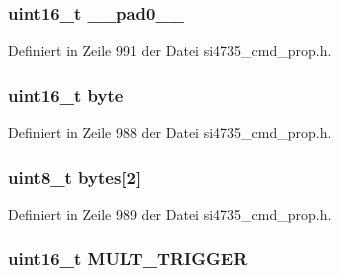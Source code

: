 \subsubsection[{\+\_\+\+\_\+pad0\+\_\+\+\_\+}]{\setlength{\rightskip}{0pt plus 5cm}uint16\+\_\+t \+\_\+\+\_\+pad0\+\_\+\+\_\+}\label{unionfm__hicut__multi__trigger__thres_a77132c2c26a75f5b8751b235cda23828}


Definiert in Zeile 991 der Datei si4735\+\_\+cmd\+\_\+prop.\+h.

\hypertarget{unionfm__hicut__multi__trigger__thres_ab0549c1b5ea980a02e7eab77e21fea49}{}
\subsubsection[{byte}]{\setlength{\rightskip}{0pt plus 5cm}uint16\+\_\+t byte}\label{unionfm__hicut__multi__trigger__thres_ab0549c1b5ea980a02e7eab77e21fea49}


Definiert in Zeile 988 der Datei si4735\+\_\+cmd\+\_\+prop.\+h.

\hypertarget{unionfm__hicut__multi__trigger__thres_a46e4c05d20a047ec169f60d3167e912e}{}
\subsubsection[{bytes}]{\setlength{\rightskip}{0pt plus 5cm}uint8\+\_\+t bytes\mbox{[}2\mbox{]}}\label{unionfm__hicut__multi__trigger__thres_a46e4c05d20a047ec169f60d3167e912e}


Definiert in Zeile 989 der Datei si4735\+\_\+cmd\+\_\+prop.\+h.

\hypertarget{unionfm__hicut__multi__trigger__thres_ac92332e1bbf71748b389eacaab7e2501}{}
\subsubsection[{M\+U\+L\+T\+\_\+\+T\+R\+I\+G\+G\+E\+R}]{\setlength{\rightskip}{0pt plus 5cm}uint16\+\_\+t M\+U\+L\+T\+\_\+\+T\+R\+I\+G\+G\+E\+R}\label{unionfm__hicut__multi__trigger__thres_ac92332e1bbf71748b389eacaab7e2501}


